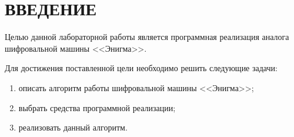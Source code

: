 \chapter*{ВВЕДЕНИЕ}

Целью данной лабораторной работы является программная реализация аналога шифровальной машины <<Энигма>>.

Для достижения поставленной цели необходимо решить следующие задачи:

\begin{enumerate}[label={\arabic*)}]
	\item описать алгоритм работы шифровальной машины <<Энигма>>;
	\item выбрать средства программной реализации;
	\item реализовать данный алгоритм.
\end{enumerate}